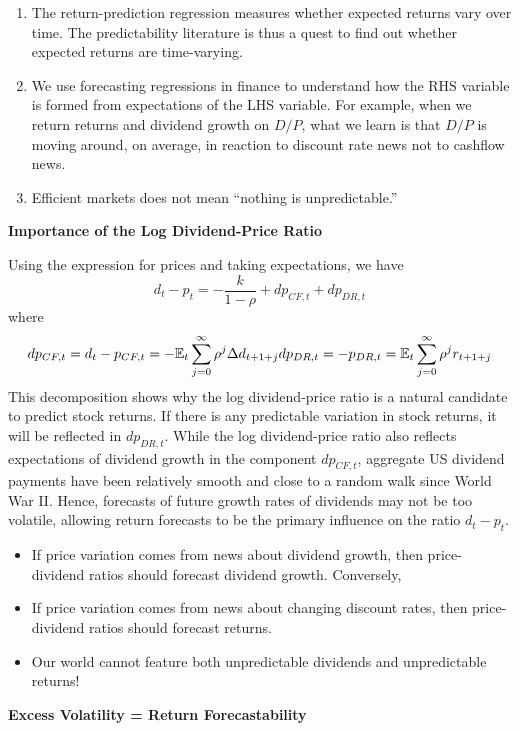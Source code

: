 \documentclass[
]{book}
\providecommand{\tightlist}{%
  \setlength{\itemsep}{0pt}\setlength{\parskip}{0pt}}
\begin{document}
\begin{enumerate}
\def\labelenumi{\arabic{enumi}.}
\tightlist
\item
  The return-prediction regression measures whether expected returns vary over time. The predictability literature is thus a quest to find out whether expected returns are time-varying.
\item
  We use forecasting regressions in finance to understand how the RHS variable is formed from expectations of the LHS variable. For example, when we return returns and dividend growth on \(D/P\), what we learn is that \(D/P\) is moving around, on average, in reaction to discount rate news not to cashflow news.
\item
  Efficient markets does not mean ``nothing is unpredictable.''
\end{enumerate}

\textbf{Importance of the Log Dividend-Price Ratio}

Using the expression for prices and taking expectations, we have
\[
d_{t}-p_{t}=-\frac{k}{1-\rho}+dp_{CF,t}+dp_{DR,t}
\]
where
\[
dp_{CF,t}=d_{t}-p_{CF,t}=-\mathbb{E}_{t}\sum_{j=0}^{\infty}\rho^{j}\Delta d_{t+1+j}\\dp_{DR,t}=-p_{DR,t}=\mathbb{E}_{t}\sum_{j=0}^{\infty}\rho^{j}r_{t+1+j}
\]
This decomposition shows why the log dividend-price ratio is a natural candidate to predict stock returns. If there is any predictable variation in stock returns, it will be reflected in \(dp_{DR,t}\). While the log dividend-price ratio also reflects expectations of dividend growth in the component \(dp_{CF,t}\), aggregate US dividend payments have been relatively smooth and close to a random walk since World War II. Hence, forecasts of future growth rates of dividends may not be too volatile, allowing return forecasts to be the primary influence on the ratio \(d_t-p_t\).

\begin{itemize}
\tightlist
\item
  If price variation comes from news about dividend growth, then price-dividend ratios should forecast dividend growth. Conversely,
\item
  If price variation comes from news about changing discount rates, then price-dividend ratios should forecast returns.
\item
  Our world cannot feature both unpredictable dividends and unpredictable returns!
\end{itemize}

\textbf{Excess Volatility = Return Forecastability}
\end{document}
